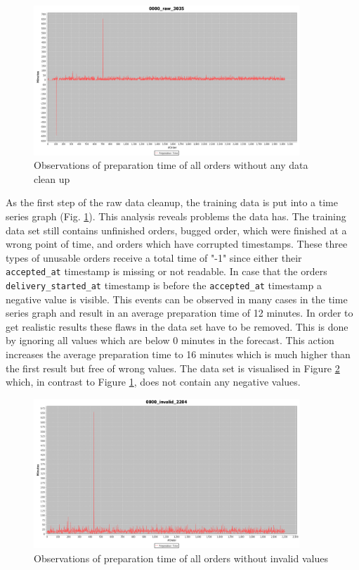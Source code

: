 \begin{figure}[h]
\begin{center}
\includegraphics[width=10cm]{images/0000_raw_3035.png}
\caption{Observations of preparation time of all orders without any data clean up}
\label{fig:0000_raw_3035}
\end{center}
\end{figure}

As the first step of the raw data cleanup, the training data is put into a time series graph (Fig. \ref{fig:0000_raw_3035}). This analysis reveals problems the data has. The training data set still contains unfinished orders, bugged order, which were finished at a wrong point of time, and orders which have corrupted timestamps. These three types of unusable orders receive a total time of "-1" since either their \texttt{accepted\_at} timestamp is missing or not readable. In case that the orders \texttt{delivery\_started\_at} timestamp is before the \texttt{accepted\_at} timestamp a negative value is visible. This events can be observed in many cases in the time series graph and result in an average preparation time of 12 minutes. In order to get realistic results these flaws in the data set have to be removed. This is done by ignoring all values which are below 0 minutes in the forecast. This action increases the average preparation time to 16 minutes which is much higher than the first result but free of wrong values. The data set is visualised in Figure \ref{fig:0000_invalid_2204} which, in contrast to Figure \ref{fig:0000_raw_3035}, does not contain any negative values.

\begin{figure}[h]
\begin{center}
\includegraphics[width=10cm]{images/0000_invalid_2204.png}
\caption{Observations of preparation time of all orders without invalid values}
\label{fig:0000_invalid_2204}
\end{center}
\end{figure}

